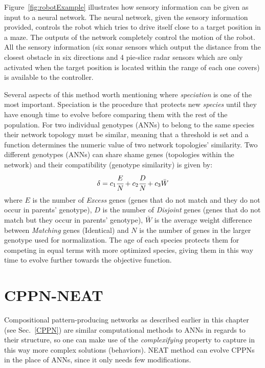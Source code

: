 Figure~\ref{fig:robotExample} illustrates how sensory information can be given as input to a neural network. The neural network, given the sensory information provided, controls the robot which tries to drive itself close to a target position in a maze. The outputs of the network completely control the motion of the robot. All the sensory information (six sonar sensors which output the distance from the closest obstacle in six directions and 4 pie-slice radar sensors which are only activated when the target position is located within the range of each one covers) is available to the controller.

Several aspects of this method worth mentioning where \emph{speciation} is one of the most important. Speciation is the procedure that protects new \emph{species} until they have enough time to evolve before comparing them with the rest of the population. For two individual genotypes (ANNs) to belong to the same species their network topology must be similar, meaning that a threshold is set and a function determines the numeric value of two network topologies' similarity. Two different genotypes (ANNs) can share shame genes (topologies within the network) and their compatibility (genotype similarity) is given by:
\begin{equation}
\label{CompatibilityEquation}
\delta = c_1 \cfrac{E}{N} + c_2 \cfrac{D}{N} + c_3 \bar{W}
\end{equation}
where $E$ is the number of \emph{Excess} genes (genes that do not match and they do not occur in parents' genotype), $D$ is the number of \emph{Disjoint} genes (genes that do not match but they occur in parents' genotype), $\bar{W}$ is the average weight difference between \emph{Matching} genes (Identical) and $N$ is the number of genes in the larger genotype used for normalization.
The age of each species protects them for competing in equal terms with more optimized species, giving them in this way time to evolve further towards the objective function.



\section{CPPN-NEAT}

Compositional pattern-producing networks as described earlier in this chapter (see Sec.~\ref{CPPN}) are similar computational methods to ANNs in regards to their structure, so one can make use of the \emph{complexifying} property to capture in this way more complex solutions (behaviors). NEAT method can evolve CPPNs in the place of ANNs, since it only needs few modifications. 

